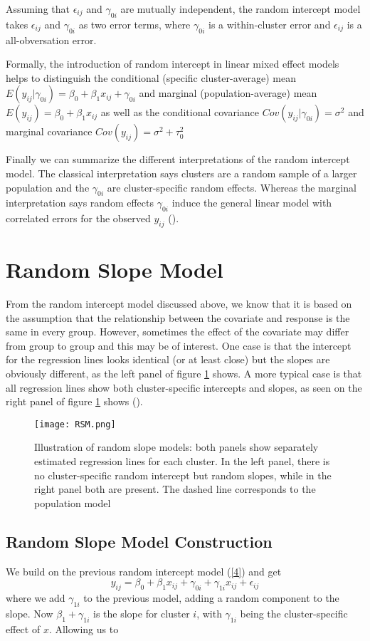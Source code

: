 \documentclass[a4paper,11pt]{article}
\begin{document}
Assuming that $\epsilon_{ij}$ and $\gamma_{0i}$ are mutually independent, the random intercept model takes $\epsilon_{ij}$ and $\gamma_{0i}$ as  two error terms, where $\gamma_{0i}$ is a within-cluster error and $\epsilon_{ij}$ is a all-obversation error.

Formally, the introduction of random intercept in linear mixed effect models helps to distinguish the conditional (specific cluster-average) mean $E(y_{ij}| \gamma_{0i}) = \beta_0 + \beta_1 x_{ij} + \gamma_{0i}$  and marginal (population-average) mean $ E(y_{ij})= \beta_0 + \beta_1 x_{ij} $ as well as the conditional covariance $Cov(y_{ij}| \gamma_{0i})= \sigma^2 $ and marginal covariance $ Cov(y_{ij})= \sigma^2 + \tau_0^2$

Finally we can summarize the different interpretations of the random intercept model.
The classical interpretation says clusters are a random sample of a larger
population and the $\gamma_{0i}$ are cluster-specific random effects. Whereas the marginal interpretation says random effects $\gamma_{0i}$ induce the general linear
model with correlated errors for the observed $y_{ij}$ (\cite{Fahrmeir}).


\section{Random Slope Model}
From the random intercept model discussed above, we know that it is based on the assumption that the relationship between the covariate and response is the same in every group. However, sometimes the effect of the covariate may differ from group to group and this may be of interest. One case is that the intercept for the regression lines looks identical (or at least close) but the slopes are obviously different, as the left panel of figure \ref{fig:label2} shows. A more typical case is that all regression lines show both cluster-specific intercepts and slopes, as seen on the right panel of figure \ref{fig:label2} shows (\cite{Fahrmeir}).

\begin{figure}[ht]
	\centering
	\texttt{[image: RSM.png]}
	\caption{Illustration of random slope models: both panels show separately estimated regression lines for each cluster. In the left panel, there is no cluster-specific random intercept but random slopes, while in the right panel both are present. The dashed line corresponds to the population model}
	\label{fig:label2}
\end{figure}
\subsection{Random Slope Model Construction}
We build on the previous random intercept model (\ref{4}) and get
\begin{equation}
y_{ij} = \beta_0 + \beta_1x_{ij} + \gamma_{0i} + \gamma_{1i}x_{ij} + \epsilon_{ij} 
\end{equation}
	where we add $\gamma_{1i}$ to the previous model, adding a random component to the slope. Now $\beta_1+\gamma_{1i}$ is the slope for cluster $i$, with $\gamma_{1i}$ being the cluster-specific effect of $x$. Allowing us to 
\end{document}
